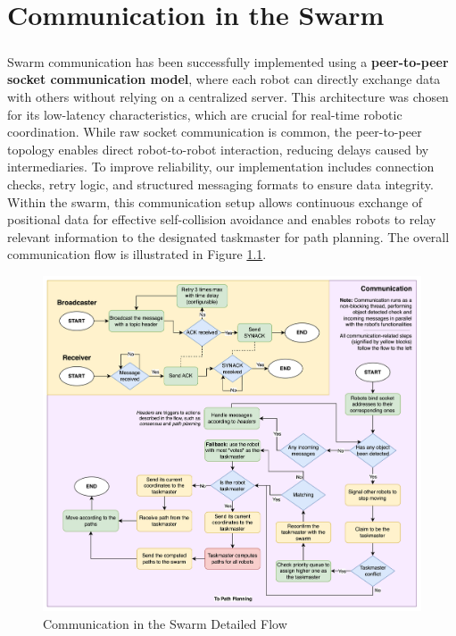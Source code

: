 \chapter{Communication in the Swarm}

\paragraph*{}
Swarm communication has been successfully implemented using a \textbf{peer-to-peer socket communication model}, where each robot can directly exchange data with others without relying on a centralized server. This architecture was chosen for its low-latency characteristics, which are crucial for real-time robotic coordination. While raw socket communication is common, the peer-to-peer topology enables direct robot-to-robot interaction, reducing delays caused by intermediaries. To improve reliability, our implementation includes connection checks, retry logic, and structured messaging formats to ensure data integrity. Within the swarm, this communication setup allows continuous exchange of positional data for effective self-collision avoidance and enables robots to relay relevant information to the designated taskmaster for path planning. The overall communication flow is illustrated in Figure \ref{fig:communication-flow}.

\begin{figure}
    \centering
    \includegraphics[width=1\linewidth]{assets/images/communication/communication-flow.png}
    \caption{Communication in the Swarm Detailed Flow}
    \label{fig:communication-flow}
\end{figure}

